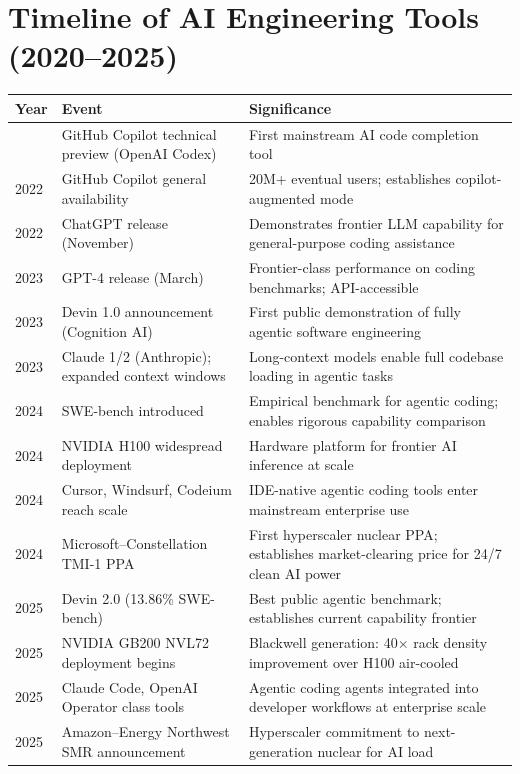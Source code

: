 \documentclass{article}
\begin{document}
\section{Timeline of AI Engineering Tools (2020--2025)}
\label{app:timeline}

\begin{longtable}{@{}p{1.2cm}p{5.5cm}p{5.5cm}@{}}
\hline
\textbf{Year} & \textbf{Event} & \textbf{Significance} \\
\hline
\endhead
\hline
\endfoot
2021 & GitHub Copilot technical preview (OpenAI Codex) & First mainstream AI code completion tool \\
2022 & GitHub Copilot general availability & 20M+ eventual users; establishes copilot-augmented mode \\
2022 & ChatGPT release (November) & Demonstrates frontier LLM capability for general-purpose coding assistance \\
2023 & GPT-4 release (March) & Frontier-class performance on coding benchmarks; API-accessible \\
2023 & Devin 1.0 announcement (Cognition AI) & First public demonstration of fully agentic software engineering \\
2023 & Claude 1/2 (Anthropic); expanded context windows & Long-context models enable full codebase loading in agentic tasks \\
2024 & SWE-bench introduced & Empirical benchmark for agentic coding; enables rigorous capability comparison \\
2024 & NVIDIA H100 widespread deployment & Hardware platform for frontier AI inference at scale \\
2024 & Cursor, Windsurf, Codeium reach scale & IDE-native agentic coding tools enter mainstream enterprise use \\
2024 & Microsoft--Constellation TMI-1 PPA & First hyperscaler nuclear PPA; establishes market-clearing price for 24/7 clean AI power \\
2025 & Devin 2.0 (13.86\% SWE-bench) & Best public agentic benchmark; establishes current capability frontier \\
2025 & NVIDIA GB200 NVL72 deployment begins & Blackwell generation: 40$\times$ rack density improvement over H100 air-cooled \\
2025 & Claude Code, OpenAI Operator class tools & Agentic coding agents integrated into developer workflows at enterprise scale \\
2025 & Amazon--Energy Northwest SMR announcement & Hyperscaler commitment to next-generation nuclear for AI load \\
\end{longtable}
\end{document}
